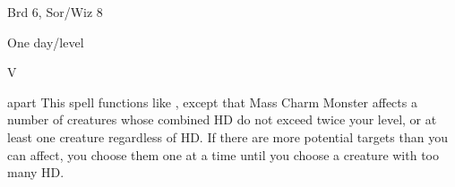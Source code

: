 
\begin{description*}
\item[Level:] Brd 6, Sor/Wiz 8
\item[Duration:] One day/level
\item[Components:] V
\end{description*}

apart
This spell functions like , except that Mass Charm
Monster affects a number of creatures whose combined HD do not exceed twice your
level, or at least one creature regardless of HD. If there are more potential targets
than you can affect, you choose them one at a time until you choose a creature
with too many HD.